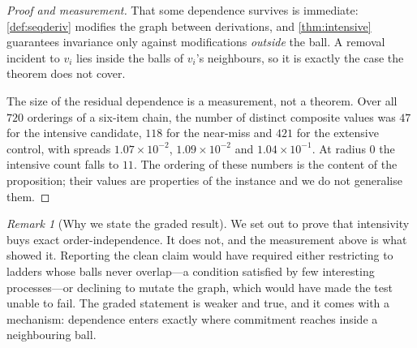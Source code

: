 \documentclass[11pt,twocolumn,a4paper]{article}
\theoremstyle{plain}
\theoremstyle{definition}
\theoremstyle{remark}
\newtheorem{remark}[theorem]{Remark}
\begin{document}
\begin{proof}[Proof and measurement]
That some dependence survives is immediate: \cref{def:seqderiv} modifies the
graph between derivations, and \cref{thm:intensive} guarantees invariance only
against modifications \emph{outside} the ball. A removal incident to $v_i$ lies
inside the balls of $v_i$'s neighbours, so it is exactly the case the theorem
does not cover.

The size of the residual dependence is a measurement, not a theorem. Over all
$720$ orderings of a six-item chain, the number of distinct composite values
was $47$ for the intensive candidate, $118$ for the near-miss and $421$ for the
extensive control, with spreads $1.07\times10^{-2}$, $1.09\times10^{-2}$ and
$1.04\times10^{-1}$. At radius $0$ the intensive count falls to $11$. The
ordering of these numbers is the content of the proposition; their values are
properties of the instance and we do not generalise them.
\end{proof}

\begin{remark}[Why we state the graded result]
\label{rem:graded-honest}
We set out to prove that intensivity buys exact order-independence. It does
not, and the measurement above is what showed it. Reporting the clean claim
would have required either restricting to ladders whose balls never overlap---a
condition satisfied by few interesting processes---or declining to mutate the
graph, which would have made the test unable to fail. The graded statement is
weaker and true, and it comes with a mechanism: dependence enters exactly where
commitment reaches inside a neighbouring ball.
\end{remark}
\end{document}
